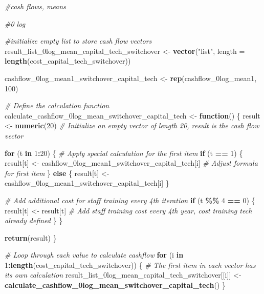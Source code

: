 \documentclass[
]{article}
\newenvironment{Shaded}{\begin{snugshade}}{\end{snugshade}}
\newcommand{\AttributeTok}[1]{\textcolor[rgb]{0.13,0.29,0.53}{#1}}
\newcommand{\CommentTok}[1]{\textcolor[rgb]{0.56,0.35,0.01}{\textit{#1}}}
\newcommand{\ControlFlowTok}[1]{\textcolor[rgb]{0.13,0.29,0.53}{\textbf{#1}}}
\newcommand{\DecValTok}[1]{\textcolor[rgb]{0.00,0.00,0.81}{#1}}
\newcommand{\FunctionTok}[1]{\textcolor[rgb]{0.13,0.29,0.53}{\textbf{#1}}}
\newcommand{\NormalTok}[1]{#1}
\newcommand{\OtherTok}[1]{\textcolor[rgb]{0.56,0.35,0.01}{#1}}
\newcommand{\SpecialCharTok}[1]{\textcolor[rgb]{0.81,0.36,0.00}{\textbf{#1}}}
\newcommand{\StringTok}[1]{\textcolor[rgb]{0.31,0.60,0.02}{#1}}
\begin{document}
\begin{Shaded}
\begin{Highlighting}[]
\CommentTok{\#cash flows, means}

\CommentTok{\#0 log}


\CommentTok{\#initialize empty list to store cash flow vectors}
\NormalTok{result\_list\_0log\_mean\_capital\_tech\_switchover }\OtherTok{\textless{}{-}} \FunctionTok{vector}\NormalTok{(}\StringTok{"list"}\NormalTok{, }\AttributeTok{length =} \FunctionTok{length}\NormalTok{(cost\_capital\_tech\_switchover))}

\NormalTok{cashflow\_0log\_mean1\_switchover\_capital\_tech }\OtherTok{\textless{}{-}} \FunctionTok{rep}\NormalTok{(cashflow\_0log\_mean1, }\DecValTok{100}\NormalTok{)}

\CommentTok{\# Define the calculation function}
\NormalTok{calculate\_cashflow\_0log\_mean\_switchover\_capital\_tech }\OtherTok{\textless{}{-}} \ControlFlowTok{function}\NormalTok{() \{}
\NormalTok{  result }\OtherTok{\textless{}{-}} \FunctionTok{numeric}\NormalTok{(}\DecValTok{20}\NormalTok{)  }\CommentTok{\# Initialize an empty vector of length 20, result is the cash flow vector}
  
  \ControlFlowTok{for}\NormalTok{ (t }\ControlFlowTok{in} \DecValTok{1}\SpecialCharTok{:}\DecValTok{20}\NormalTok{) \{}
    \CommentTok{\# Apply special calculation for the first item}
    \ControlFlowTok{if}\NormalTok{ (t }\SpecialCharTok{==} \DecValTok{1}\NormalTok{) \{}
\NormalTok{      result[t] }\OtherTok{\textless{}{-}}\NormalTok{ cashflow\_0log\_mean1\_switchover\_capital\_tech[i] }\CommentTok{\# Adjust formula for first item}
\NormalTok{    \} }\ControlFlowTok{else}\NormalTok{ \{}
\NormalTok{      result[t] }\OtherTok{\textless{}{-}}\NormalTok{ cashflow\_0log\_mean1\_switchover\_capital\_tech[i]}
\NormalTok{    \}}
    
    \CommentTok{\# Add additional cost for staff training every 4th iteration}
    \ControlFlowTok{if}\NormalTok{ (t }\SpecialCharTok{\%\%} \DecValTok{4} \SpecialCharTok{==} \DecValTok{0}\NormalTok{) \{}
\NormalTok{      result[t] }\OtherTok{\textless{}{-}}\NormalTok{ result[t]  }\CommentTok{\# Add staff training cost every 4th year, cost training tech already defined}
\NormalTok{    \}}
\NormalTok{  \}}
  
  \FunctionTok{return}\NormalTok{(result)}
\NormalTok{\}}

\CommentTok{\# Loop through each value to calculate cashflow}
\ControlFlowTok{for}\NormalTok{ (i }\ControlFlowTok{in} \DecValTok{1}\SpecialCharTok{:}\FunctionTok{length}\NormalTok{(cost\_capital\_tech\_switchover)) \{}
  \CommentTok{\# The first item in each vector has its own calculation}
\NormalTok{  result\_list\_0log\_mean\_capital\_tech\_switchover[[i]] }\OtherTok{\textless{}{-}} \FunctionTok{calculate\_cashflow\_0log\_mean\_switchover\_capital\_tech}\NormalTok{()}
\NormalTok{\}}




\end{Highlighting}
\end{Shaded}
\end{document}
